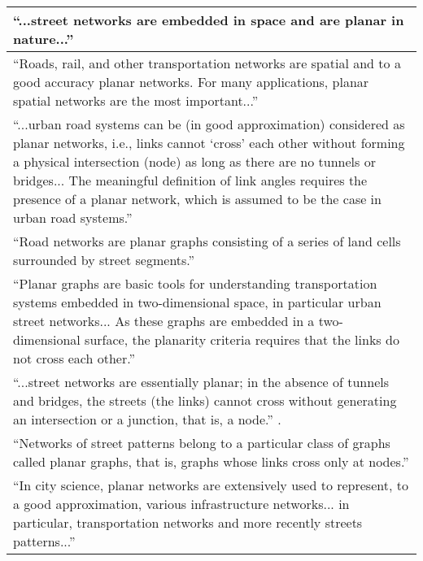 \begin{tabular}{ | p{\textwidth} | }
\enquote{...street networks are embedded in space and are planar in nature...} \citep[p.~114]{porta_networks_2010} \\ \hline

\enquote{Roads, rail, and other transportation networks are spatial and to a good accuracy planar networks. For many applications, planar spatial networks are the most important...} \citep[p.~3]{barthelemy_spatial_2011} \\ \hline

\enquote{...urban road systems can be (in good approximation) considered as planar networks, i.e., links cannot \enquote{cross} each other without forming a physical intersection (node) as long as there are no tunnels or bridges... The meaningful definition of link angles requires the presence of a planar network, which is assumed to be the case in urban road systems.} \citep[pp.~563~\&~567]{chan_urban_2011} \\ \hline

\enquote{Road networks are planar graphs consisting of a series of land cells surrounded by street segments.} \citep[p.~3]{strano_elementary_2012} \\ \hline

\enquote{Planar graphs are basic tools for understanding transportation systems embedded in two-dimensional space, in particular urban street networks... As these graphs are embedded in a two-dimensional surface, the
planarity criteria requires that the links do not cross each other.} \citep[p.~1]{masucci_limited_2013} \\ \hline

\enquote{...street networks are essentially planar; in the absence of tunnels and bridges, the streets (the links) cannot cross without generating an intersection or a junction, that is, a node.} \citep[p.~1]{gudmundsson_entropy_2013}. \\ \hline

\enquote{Networks of street patterns belong to a particular class of graphs called planar graphs, that is, graphs whose links cross only at nodes.} \citep[p.~1074]{strano_urban_2013} \\ \hline

\enquote{In city science, planar networks are extensively used to represent, to a good approximation, various infrastructure networks... in particular, transportation networks and more recently streets patterns...} \citep[p.~1]{viana_simplicity_2013} \\ \hline


\end{tabular}
